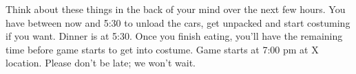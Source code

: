 \documentclass[green]{GL2020}
\begin{document}
Think about these things in the back of your mind over the next few hours. You have between now and 5:30 to unload the cars, get unpacked and start costuming if you want. Dinner is at 5:30. Once you finish eating, you’ll have the remaining time before game starts to get into costume. Game starts at 7:00 pm at X location. Please don’t be late; we won’t wait.
\end{document}
